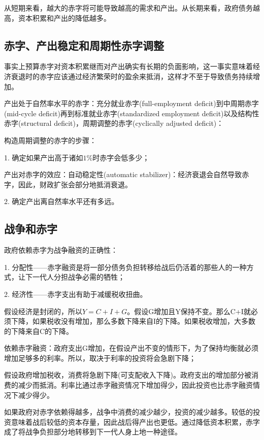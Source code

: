 \documentclass{article}
\begin{document}
从短期来看，越大的赤字将可能导致越高的需求和产出。从长期来看，政府债务越高，资本积累和产出的降低越多。

\subsection{赤字、产出稳定和周期性赤字调整}

事实上预算赤字对资本积累继而对产出确实有长期的负面影响，这一事实意味着经济衰退时的赤字应该通过经济繁荣时的盈余来抵消，这样才不至于导致债务持续增加。

产出处于自然率水平的赤字：充分就业赤字(full-employment deficit)到中周期赤字(mid-cycle deficit)再到标准就业赤字(standardized employment deficit)以及结构性赤字(structural deficit)，周期调整的赤字(cyclically adjusted deficit)：

构造周期调整的赤字的步骤：

1. 确定如果产出高于诸如$ 1\% $时赤字会低多少；

产出对赤字的效应：自动稳定性(automatic stabilizer)：经济衰退会自然导致赤字，因此，财政扩张会部分地抵消衰退。

2. 确定产出离自然率水平还有多远。

\subsection{战争和赤字}

政府依赖赤字为战争融资的正确性：

1. 分配性——赤字融资是将一部分债务负担转移给战后仍活着的那些人的一种方式，让下一代人分担战争必需的牺牲；

2. 经济性——赤字支出有助于减缓税收扭曲。

\hspace*{\fill}

假设经济是封闭的，所以$ Y=C+I+G $。假设G增加且Y保持不变。那么C+I就必须下降，如果税收没有增加，那么多数下降来自I的下降。如果税收增加，大多数的下降来自C的下降。

依赖赤字融资：政府支出G增加，在假设产出不变的情形下，为了保持均衡就必须增加足够多的利率。所以，取决于利率的投资将会急剧下降；

假设政府增加税收，消费将急剧下降(可支配收入下降)。政府支出的增加部分被消费的减少而抵消。利率比通过赤字融资情况下增加得少，因此投资也比赤字融资情况下减少得少。

如果政府对赤字依赖得越多，战争中消费的减少越少，投资的减少越多。较低的投资意味着战后较低的资本存量，因此战后得产出也更低。通过降低资本积累，赤字成了将战争负担部分地转移到下一代人身上地一种途径。
\end{document}
